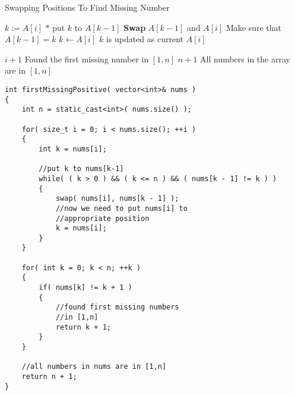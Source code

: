 \setcounter{algorithm}{0}
\begin{algorithm}[H]
\caption{Swapping Positions To Find Missing Number}
\begin{algorithmic}[1]
\State $k:=A[i]$
\State $\ast$ put $k$ to $A[k-1]$
\State \textbf{Swap} $A[k-1]$ and $A[i]$ \Comment Make sure that $A[k-1] = k$
\State $k \gets A[i]$ \Comment $k$ is updated as current $A[i]$
\EndWhile
\EndFor
{}
\end{algorithmic}
\end{algorithm}
\begin{algorithm}[H]
\begin{algorithmic}[1]
\State \Return $i+1$ \Comment Found the first missing number in $[1,n]$
\EndIf
\EndFor
\State \Return $n+1$ \Comment All numbers in the array are in $[1,n]$
\EndProcedure
\end{algorithmic}
\end{algorithm}

\setcounter{lstlisting}{0}
\begin{lstlisting}[style=customc, caption={Swap}]
int firstMissingPositive( vector<int>& nums )
{
    int n = static_cast<int>( nums.size() );

    for( size_t i = 0; i < nums.size(); ++i )
    {
        int k = nums[i];

        //put k to nums[k-1]
        while( ( k > 0 ) && ( k <= n ) && ( nums[k - 1] != k ) )
        {
            swap( nums[i], nums[k - 1] );
            //now we need to put nums[i] to
            //appropriate position
            k = nums[i];
        }
    }

    for( int k = 0; k < n; ++k )
    {
        if( nums[k] != k + 1 )
        {
            //found first missing numbers
            //in [1,n]
            return k + 1;
        }
    }

    //all numbers in nums are in [1,n]
    return n + 1;
}
\end{lstlisting}
